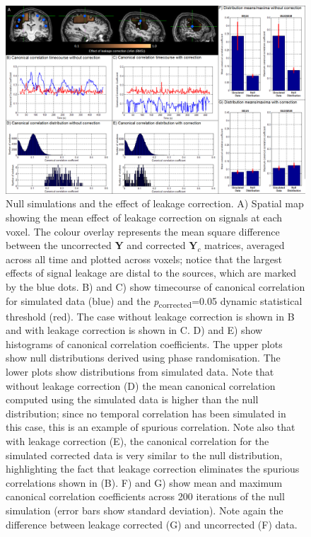 \begin{figure}
	\includegraphics[width=\linewidth]{./images/chapter4/figure_4.png}\caption{Null simulations and the effect of leakage correction. A) Spatial map showing the mean effect of leakage correction on signals at each voxel. The colour overlay represents the mean square difference between the uncorrected \textbf{Y} and corrected $\mathbf{Y}_c$ matrices, averaged across all time and plotted across voxels; notice that the largest effects of signal leakage are distal to the sources, which are marked by the blue dots. B) and C) show timecourse of canonical correlation for simulated data (blue) and the \textit{p}\textsubscript{corrected}=0.05 dynamic statistical threshold (red). The case without leakage correction is shown in B and with leakage correction is shown in C. D) and E) show histograms of canonical correlation coefficients. The upper plots show null distributions derived using phase randomisation. The lower plots show distributions from simulated data. Note that without leakage correction (D) the mean canonical correlation computed using the simulated data is higher than the null distribution; since no temporal correlation has been simulated in this case, this is an example of spurious correlation. Note also that with leakage correction (E), the canonical correlation for the simulated corrected data is very similar to the null distribution, highlighting the fact that leakage correction eliminates the spurious correlations shown in (B). F) and G) show mean and maximum canonical correlation coefficients across 200 iterations of the null simulation (error bars show standard deviation). Note again the difference between leakage corrected (G) and uncorrected (F) data.}\label{fig_4_4}
\end{figure}

